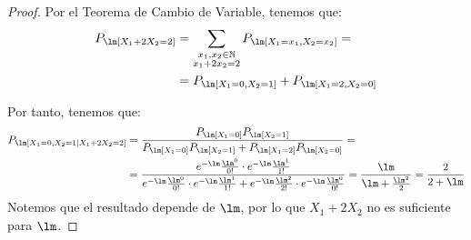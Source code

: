 \begin{ejemplo}
\begin{proof}
        Por el Teorema de Cambio de Variable, tenemos que:
        \begin{align*}
            P_\lm[X_1+2X_2=2]
            &= \sum\limits_{\substack{x_1,x_2\in\bb{N}\\x_1+2x_2=2}} P_\lm[X_1=x_1, X_2=x_2]
            =\\&= P_\lm[X_1=0, X_2=1] + P_\lm[X_1=2, X_2=0]
        \end{align*}

        Por tanto, tenemos que:
        \begin{align*}
            P_\lm[X_1=0, X_2=1 \mid X_1+2X_2=2] &= \dfrac{P_\lm[X_1=0]P_\lm[X_2=1]}{P_\lm[X_1=0]P_\lm[X_2=1] + P_\lm[X_1=2]P_\lm[X_2=0]} =\\&= \dfrac{e^{-\lm}\frac{\lm^0}{0!} \cdot e^{-\lm}\frac{\lm^1}{1!}}{e^{-\lm}\frac{\lm^0}{0!} \cdot e^{-\lm}\frac{\lm^1}{1!} + e^{-\lm}\frac{\lm^2}{2!} \cdot e^{-\lm}\frac{\lm^0}{0!}} 
            = \dfrac{\lm}{\lm + \frac{\lm^2}{2}} = \dfrac{2}{2+\lm}
        \end{align*}
        Notemos que el resultado depende de $\lm$, por lo que $X_1+2X_2$ no es suficiente para $\lm$.
    \end{proof}
\end{ejemplo}

